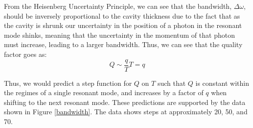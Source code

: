 \documentclass{report}
\begin{document}
            From the Heisenberg Uncertainty Principle, we can see that the bandwidth, $\Delta\omega$, should be inversely proportional to the cavity thickness due to the fact that as the cavity is shrunk our uncertainty in the position of a photon in the resonant mode shinks, meaning that the uncertainty in the momentum of that photon must increase, leading to a larger bandwidth. Thus, we can see that the quality factor goes as:
            \begin{equation}
                Q\sim\frac{q}{T}T=q
            \end{equation}
            
            Thus, we would predict a step function for $Q$ on $T$ such that $Q$ is constant within the regimes of a single resonant mode, and increases by a factor of $q$ when shifting to the next resonant mode. These predictions are supported by the data shown in Figure \ref{bandwidth}. The data shows steps at approximately 20, 50, and 70.



        
\end{document}
